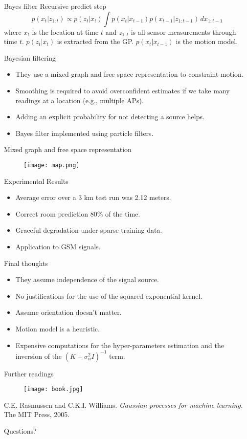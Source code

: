\documentclass{beamer}
\begin{document}
\begin{frame}{Bayes filter}
  Recursive predict step
  \[
  p(x_t|z_{1:t}) \propto p(z_t|x_t) \int p(x_t|x_{t-1}) p(x_{t-1}|z_{1:t-1})\, dx_{1:t-1}
  \]
  where $x_t$ is the location at time $t$ and $z_{1:t}$ is all sensor
  measurements through time $t$. $p(z_t|x_t)$ is extracted from the
  GP. $p(x_t|x_{t-1})$ is the motion model.
\end{frame}

\begin{frame}{Bayesian filtering}
  \begin{itemize}
  \item They use a mixed graph and free space representation to constraint
    motion.
  \item Smoothing is required to avoid overconfident estimates if we take many
    readings at a location (e.g., multiple APs).
  \item Adding an explicit probability for not detecting a source helps.
  \item Bayes filter implemented using particle filters.
  \end{itemize}
\end{frame}

\begin{frame}{Mixed graph and free space representation}
  \begin{figure}
    \centering
    \texttt{[image: map.png]}
  \end{figure}
\end{frame}

\begin{frame}{Experimental Results}
  \begin{itemize}
  \item Average error over a 3 km test run was 2.12 meters.
  \item Correct room prediction 80\% of the time.
  \item Graceful degradation under sparse training data.
  \item Application to GSM signals.
  \end{itemize}
\end{frame}

\begin{frame}{Final thoughts}
  \begin{itemize}
  \item They assume independence of the signal source.
  \item No justifications for the use of the squared exponential kernel.
  \item Assume orientation doesn't matter.
  \item Motion model is a heuristic.
  \item Expensive computations for the hyper-parameters estimation and the
    inversion of the $(K+\sigma_n^2I)^{-1}$ term.
  \end{itemize}
\end{frame}

\begin{frame}{Further readings}
  \begin{figure}
    \centering
    \texttt{[image: book.jpg]}
  \end{figure}
  C.E. Rasmussen and C.K.I. Williams. \textit{Gaussian processes
    for machine learning.} The MIT Press, 2005.
\end{frame}

\begin{frame}{Questions?}
  
\end{frame}
\end{document}
